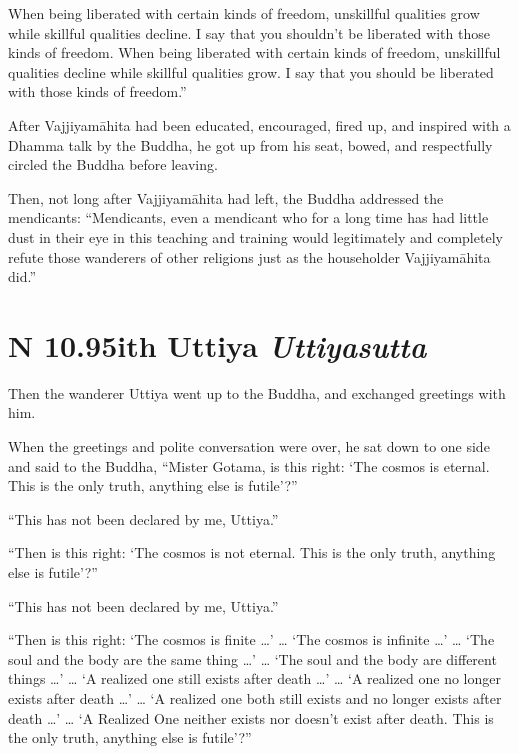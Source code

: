 \documentclass[12pt,openany]{book}%
\newcommand*{\suttatitleacronym}[1]{\smaller[2]{#1}\vspace*{.3em}}
\newcommand*{\suttatitletranslation}[1]{\linebreak{#1}}
\newcommand*{\suttatitleroot}[1]{\linebreak\smaller[2]\itshape{#1}}
\newcommand*{\tocacronym}[1]{\hspace*{-3.3em}{#1}\quad}
\newcommand*{\toctranslation}[1]{#1}
\newcommand*{\tocroot}[1]{(\textit{#1})}
\begin{document}
When being liberated with certain kinds of freedom, unskillful qualities grow while skillful qualities decline. I say that you shouldn’t be liberated with those kinds of freedom. When being liberated with certain kinds of freedom, unskillful qualities decline while skillful qualities grow. I say that you should be liberated with those kinds of freedom.” 

After \textsanskrit{Vajjiyamāhita} had been educated, encouraged, fired up, and inspired with a Dhamma talk by the Buddha, he got up from his seat, bowed, and respectfully circled the Buddha before leaving. 

Then, not long after \textsanskrit{Vajjiyamāhita} had left, the Buddha addressed the mendicants: “Mendicants, even a mendicant who for a long time has had little dust in their eye in this teaching and training would legitimately and completely refute those wanderers of other religions just as the householder \textsanskrit{Vajjiyamāhita} did.” 

%
\section*{{\suttatitleacronym AN 10.95}{\suttatitletranslation With Uttiya }{\suttatitleroot Uttiyasutta}}
\addcontentsline{toc}{section}{\tocacronym{AN 10.95} \toctranslation{With Uttiya } \tocroot{Uttiyasutta}}

Then the wanderer Uttiya went up to the Buddha, and exchanged greetings with him. 

When the greetings and polite conversation were over, he sat down to one side and said to the Buddha, “Mister Gotama, is this right: ‘The cosmos is eternal. This is the only truth, anything else is futile’?” 

“This has not been declared by me, Uttiya.” 

“Then is this right: ‘The cosmos is not eternal. This is the only truth, anything else is futile’?” 

“This has not been declared by me, Uttiya.” 

“Then is this right: ‘The cosmos is finite …’ … ‘The cosmos is infinite …’ … ‘The soul and the body are the same thing …’ … ‘The soul and the body are different things …’ … ‘A realized one still exists after death …’ … ‘A realized one no longer exists after death …’ … ‘A realized one both still exists and no longer exists after death …’ … ‘A Realized One neither exists nor doesn’t exist after death. This is the only truth, anything else is futile’?” 
\end{document}
